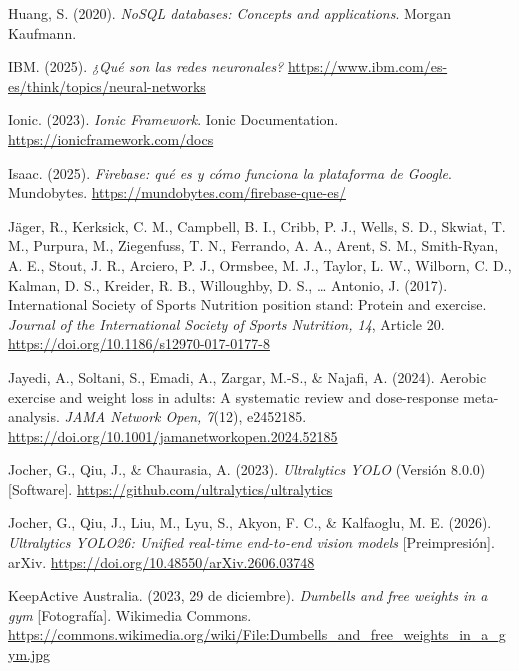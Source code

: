 \begin{referenciasapa}
\item Huang, S. (2020). \textit{NoSQL databases: Concepts and applications}. Morgan Kaufmann.

\item IBM. (2025). \textit{¿Qué son las redes neuronales?} \url{https://www.ibm.com/es-es/think/topics/neural-networks}

\item Ionic. (2023). \textit{Ionic Framework}. Ionic Documentation. \url{https://ionicframework.com/docs}

\item Isaac. (2025). \textit{Firebase: qué es y cómo funciona la plataforma de Google}. Mundobytes. \url{https://mundobytes.com/firebase-que-es/}

\item Jäger, R., Kerksick, C. M., Campbell, B. I., Cribb, P. J., Wells, S. D., Skwiat, T. M., Purpura, M., Ziegenfuss, T. N., Ferrando, A. A., Arent, S. M., Smith-Ryan, A. E., Stout, J. R., Arciero, P. J., Ormsbee, M. J., Taylor, L. W., Wilborn, C. D., Kalman, D. S., Kreider, R. B., Willoughby, D. S., \ldots{} Antonio, J. (2017). International Society of Sports Nutrition position stand: Protein and exercise. \textit{Journal of the International Society of Sports Nutrition, 14}, Article 20. \url{https://doi.org/10.1186/s12970-017-0177-8}

\item Jayedi, A., Soltani, S., Emadi, A., Zargar, M.-S., \& Najafi, A. (2024).
    Aerobic exercise and weight loss in adults: A systematic review and dose-response meta-analysis.
    \textit{JAMA Network Open, 7}(12), e2452185.
    \url{https://doi.org/10.1001/jamanetworkopen.2024.52185}

\item Jocher, G., Qiu, J., \& Chaurasia, A. (2023). \textit{Ultralytics YOLO} (Versión 8.0.0) [Software]. \url{https://github.com/ultralytics/ultralytics}

\item Jocher, G., Qiu, J., Liu, M., Lyu, S., Akyon, F. C., \& Kalfaoglu, M. E. (2026). \textit{Ultralytics YOLO26: Unified real-time end-to-end vision models} [Preimpresión]. arXiv. \url{https://doi.org/10.48550/arXiv.2606.03748}

\item KeepActive Australia. (2023, 29 de diciembre). \textit{Dumbells and free weights in a gym} [Fotografía]. Wikimedia Commons. \url{https://commons.wikimedia.org/wiki/File:Dumbells_and_free_weights_in_a_gym.jpg}


\end{referenciasapa}
